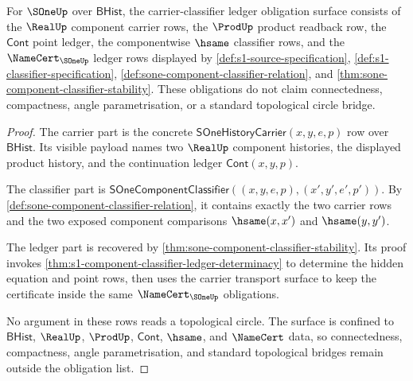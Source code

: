 \begin{theorem}
\label{thm:s1-carrier-classifier-ledger-obligation-surface}
For $\SOneUp$ over $\mathsf{BHist}$, the carrier-classifier ledger obligation
surface consists of the $\RealUp$ component carrier rows, the $\ProdUp$ product
readback row, the $\mathsf{Cont}$ point ledger, the componentwise $\hsame$
classifier rows, and the $\NameCert_{\SOneUp}$ ledger rows displayed by
\autoref{def:s1-source-specification}, \autoref{def:s1-classifier-specification},
\autoref{def:sone-component-classifier-relation}, and
\autoref{thm:sone-component-classifier-stability}. These obligations do not
claim connectedness, compactness, angle parametrisation, or a standard
topological circle bridge.
\end{theorem}
\begin{proof}
The carrier part is the concrete
$\mathsf{SOneHistoryCarrier}(x,y,e,p)$ row over $\mathsf{BHist}$. Its visible
payload names two $\RealUp$ component histories, the displayed product history,
and the continuation ledger $\mathsf{Cont}(x,y,p)$.

The classifier part is
$\mathsf{SOneComponentClassifier}((x,y,e,p),(x',y',e',p'))$. By
\autoref{def:sone-component-classifier-relation}, it contains exactly the two
carrier rows and the two exposed component comparisons $\hsame(x,x')$ and
$\hsame(y,y')$.

The ledger part is recovered by
\autoref{thm:sone-component-classifier-stability}. Its proof invokes
\autoref{thm:s1-component-classifier-ledger-determinacy} to determine the
hidden equation and point rows, then uses the carrier transport surface to keep
the certificate inside the same $\NameCert_{\SOneUp}$ obligations.

No argument in these rows reads a topological circle. The surface is confined
to $\mathsf{BHist}$, $\RealUp$, $\ProdUp$, $\mathsf{Cont}$, $\hsame$, and
$\NameCert$ data, so connectedness, compactness, angle parametrisation, and
standard topological bridges remain outside the obligation list.
\end{proof}

